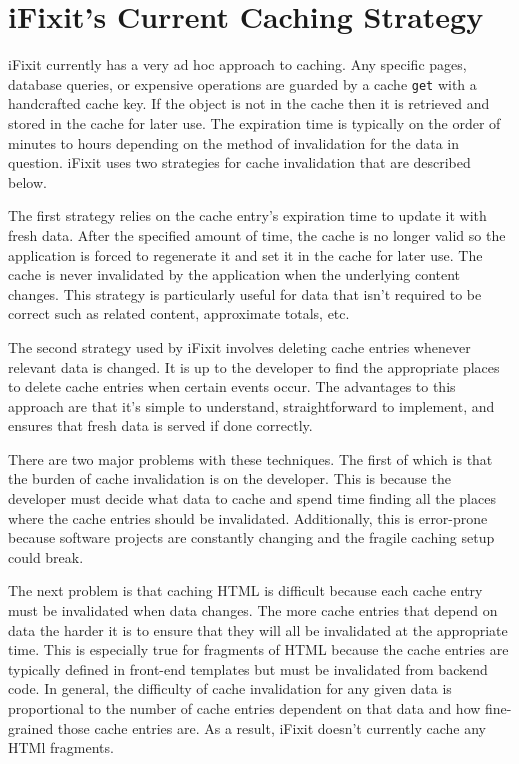 \documentclass[12pt]{ucthesis}
\begin{document}
\section{iFixit's Current Caching Strategy}
iFixit currently has a very ad hoc approach to caching.
Any specific pages, database queries, or expensive operations are guarded by a cache {\tt get} with a handcrafted cache key.
If the object is not in the cache then it is retrieved and stored in the cache for later use.
The expiration time is typically on the order of minutes to hours depending on the method of invalidation for the data in question.
iFixit uses two strategies for cache invalidation that are described below.

The first strategy relies on the cache entry's expiration time to update it with fresh data.
After the specified amount of time, the cache is no longer valid so the application is forced to regenerate it and set it in the cache for later use.
The cache is never invalidated by the application when the underlying content changes.
This strategy is particularly useful for data that isn't required to be correct such as related content, approximate totals, etc.

The second strategy used by iFixit involves deleting cache entries whenever relevant data is changed.
It is up to the developer to find the appropriate places to delete cache entries when certain events occur.
The advantages to this approach are that it's simple to understand, straightforward to implement, and ensures that fresh data is served if done correctly.

There are two major problems with these techniques.
The first of which is that the burden of cache invalidation is on the developer.
This is because the developer must decide what data to cache and spend time finding all the places where the cache entries should be invalidated.
Additionally, this is error-prone because software projects are constantly changing and the fragile caching setup could break.

The next problem is that caching HTML is difficult because each cache entry must be invalidated when data changes.
The more cache entries that depend on data the harder it is to ensure that they will all be invalidated at the appropriate time.
This is especially true for fragments of HTML because the cache entries are typically defined in front-end templates but must be invalidated from backend code.
In general, the difficulty of cache invalidation for any given data is proportional to the number of cache entries dependent on that data and how fine-grained those cache entries are.
As a result, iFixit doesn't currently cache any HTMl fragments.
\end{document}
